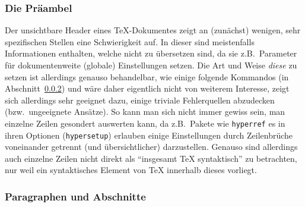 \subsubsection{Die Präambel}
Der unsichtbare Header eines \TeX{}-Dokumentes zeigt an (zunächst) wenigen, sehr spezifischen Stellen eine Schwierigkeit auf. In dieser sind meistenfalls Informationen enthalten, welche nicht zu übersetzen sind, da sie z.B.\ Parameter für dokumentenweite (globale) Einstellungen setzen. Die Art und Weise \textit{diese} zu setzen ist allerdings genauso behandelbar, wie einige folgende Kommandos (in Abschnitt~\ref{}) und wäre daher eigentlich nicht von weiterem Interesse, zeigt sich allerdings sehr geeignet dazu, einige triviale Fehlerquellen abzudecken (bzw.\ ungeeignete Ansätze). So kann man sich nicht immer gewiss sein, man einzelne Zeilen gesondert auswerten kann, da z.B.\ Pakete wie \texttt{hyperref} es in ihren Optionen (\texttt{hypersetup}) erlauben einige Einstellungen durch Zeilenbrüche voneinander getrennt (und übersichtlicher) darzustellen.%
Genauso sind allerdings auch einzelne Zeilen nicht direkt als \enquote{insgesamt \TeX{} syntaktisch} zu betrachten, nur weil ein syntaktisches Element von \TeX{} innerhalb dieses vorliegt.%






\subsubsection{Paragraphen und Abschnitte}

